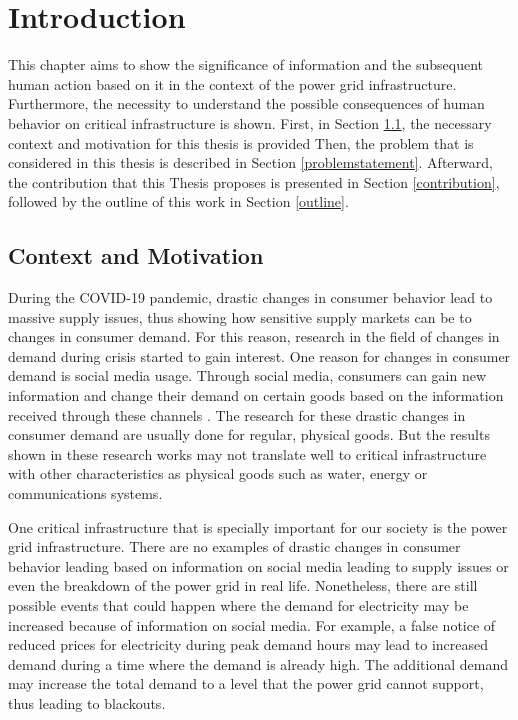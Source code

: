 \chapter{Introduction}

This chapter aims to show the significance of information and 
the subsequent human action based on it
in the context of the power grid infrastructure.
Furthermore, the necessity to understand the possible consequences 
of human behavior on critical infrastructure is shown. 
First, in Section \ref{contextmotivation}, the necessary context and motivation for this thesis is provided
Then, the problem that is considered in this thesis is described 
in Section \ref{problemstatement}. Afterward, the contribution that this
Thesis proposes is presented in Section \ref{contribution}, 
followed by the outline of this work in Section \ref{outline}.

\section{Context and Motivation}
\label{contextmotivation}

During the COVID-19 pandemic, drastic changes in consumer behavior
lead to massive supply issues, thus showing how sensitive supply markets 
can be to changes in consumer demand.
For this reason, research in the field of changes in demand during crisis
started to gain interest. One reason for changes in consumer demand is 
social media usage. Through social media, consumers can gain new information
and change their demand on certain goods based on the information received 
through these channels \cite{naeem2021social}.
The research for these drastic changes in consumer demand are usually
done for regular, physical goods. But the results shown in these 
research works may not translate well to critical infrastructure
with other characteristics as physical goods such as 
water, energy or communications systems.

One critical infrastructure that is specially important for 
our society is the power grid infrastructure.
There are no examples of drastic changes in consumer behavior leading
based on information on social media leading to supply issues or
even the breakdown of the power grid in real life. Nonetheless, there 
are still possible events that could happen where the demand for
electricity may be increased because of information on social media.
For example, a false notice of reduced prices for electricity
during peak demand hours may lead to increased demand during 
a time where the demand is already high. The additional demand
may increase the total demand to a level that the power grid
cannot support, thus leading to blackouts.


